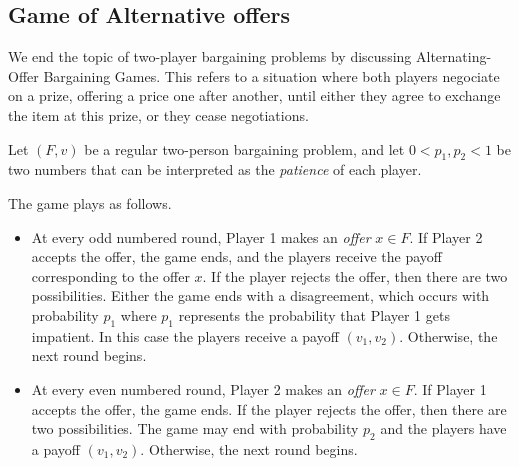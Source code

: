 

\subsection{Game of Alternative offers}

We end the topic of two-player bargaining problems by discussing Alternating-Offer Bargaining Games. This refers to a situation where both players negociate on a prize, offering a price one after another, until either they agree to exchange the item at this prize, or they cease negotiations.

Let $(F,v)$ be a regular two-person bargaining problem, and let $0 < p_1, p_2 < 1$  be two numbers that can be interpreted as the \emph{patience} of each player.

The game plays as follows.
\begin{itemize}
\item At every odd numbered round, Player 1 makes an \emph{offer} $x \in F$. If Player 2 accepts the offer, the game ends, and the players receive the payoff corresponding to the offer $ x $. If the player rejects the offer, then there are two possibilities. Either the game ends with a disagreement, which occurs with probability $p_1$ where $p_1$ represents the probability that Player 1 gets impatient. In this case the players receive a payoff $(v_1,v_2)$. Otherwise, the next round begins.
\item  At every even numbered round, Player 2 makes an \emph{offer} $x \in F$. If Player 1 accepts the offer, the game ends. If the player rejects the offer, then there are two possibilities.
The game  may end with probability $p_2$ and the players have a payoff $(v_1,v_2)$. Otherwise, the next round begins.
\end{itemize}


